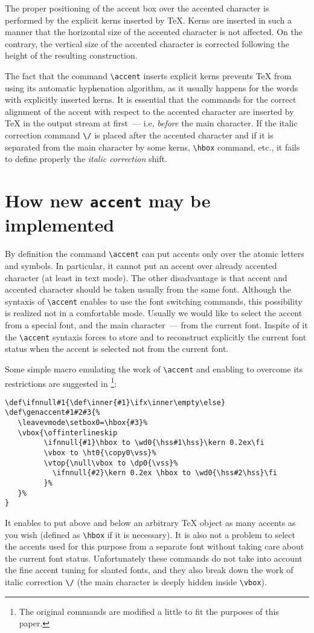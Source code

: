 The proper positioning of the accent box over the accented character
is performed by the explicit kerns inserted by \TeX. Kerns
are inserted in such a manner that the horizontal size of
the accented character is not affected.
On the contrary, the vertical size of the accented character is
corrected following the height of the resulting construction.

The fact that the command \verb?\accent? inserts explicit kerns
prevents \TeX{} from using its automatic hyphenation
algorithm, as it usually happens for the words with explicitly inserted
kerns.
It is essential that the commands for the correct alignment of the accent
with respect to the accented character are inserted by \TeX{} in the output
stream at first~--- i.e, {\em before} the main character.
If the italic correction command  \verb?\/? is placed after
the accented character and if it is separated from the main character
by some kerns, \verb?\hbox? command, etc., it fails to define properly
the {\em italic correction} shift.

\section{How new {\tt\bs{}accent} may be implemented\label{S-acentI}}

By definition the command \verb?\accent? can put accents only over
the atomic letters and symbols. In particular, it cannot put an
accent over already accented character (at least in text mode).
The other disadvantage is that accent and accented character should
be taken usually from the same font. Although the syntaxis of
\verb?\accent? enables to use the font switching commands,
this possibility is realized not in a comfortable mode.
Usually we would like to select the accent from a special font, and
the main character~--- from the current font. Inspite of it
the \verb?\accent? syntaxis forces to store and to reconstruct
explicitly the current font status when the accent is selected
not from the current font.

Some simple macro emulating the work of \verb?\accent? and enabling
to overcome its restrictions are suggested in \cite{SOL}%
   \footnote{The original commands are modified a little
             to fit the purposes of this paper.}:
\begin{verbatim}
\def\ifnnull#1{\def\inner{#1}\ifx\inner\empty\else}
\def\genaccent#1#2#3{%
   \leavevmode\setbox0=\hbox{#3}%
   \vbox{\offinterlineskip
         \ifnnull{#1}\hbox to \wd0{\hss#1\hss}\kern 0.2ex\fi
         \vbox to \ht0{\copy0\vss}%
         \vtop{\null\vbox to \dp0{\vss}%
           \ifnnull{#2}\kern 0.2ex \hbox to \wd0{\hss#2\hss}\fi
         }%
   }%
}
\end{verbatim}
It enables to put above and below an arbitrary \TeX{} object
as many accents as you wish (defined as \verb?\hbox? if it is necessary).
It is also not a problem to select the accents used for this purpose
from a separate font without taking care about the current font status.
Unfortunately these commands do not take into account the
fine accent tuning for slanted fonts, and they also
break down the work of italic correction \verb?\/?
(the main character is deeply hidden inside \verb?\vbox?).

